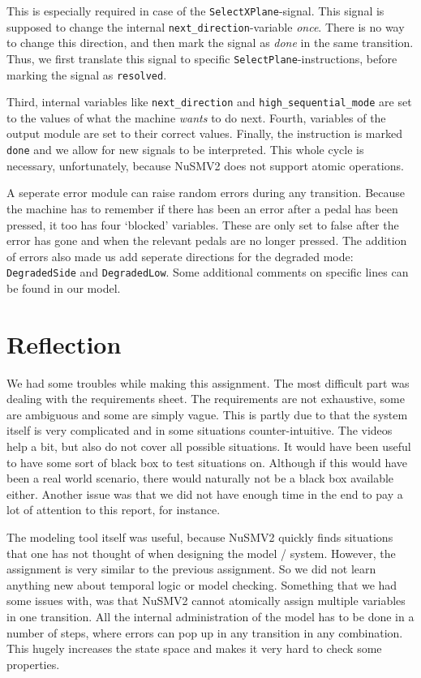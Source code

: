 \documentclass[a4paper,10pt]{article}
\begin{document}
	This is especially required in case of the \texttt{SelectXPlane}-signal.
	This signal is supposed to change the internal \texttt{next\_direction}-variable \emph{once}.
	There is no way to change this direction, and then mark the signal as \emph{done} in the same transition.
	Thus, we first translate this signal to specific \texttt{SelectPlane}-instructions, before marking the signal as \texttt{resolved}.

	Third, internal variables like \texttt{next\_direction} and \texttt{high\_sequential\_mode} are set to the values of what the machine \emph{wants} to do next.
	Fourth, variables of the output module are set to their correct values.
	Finally, the instruction is marked \texttt{done} and we allow for new signals to be interpreted.
	This whole cycle is necessary, unfortunately, because NuSMV2 does not support atomic operations.
	
	A seperate error module can raise random errors during any transition.
	Because the machine has to remember if there has been an error after a pedal has been pressed, it too has four `blocked' variables.
	These are only set to false after the error has gone and when the relevant pedals are no longer pressed.
	The addition of errors also made us add seperate directions for the degraded mode: \texttt{DegradedSide} and \texttt{DegradedLow}.
	Some additional comments on specific lines can be found in our model.

	\section{Reflection}
	We had some troubles while making this assignment.
	The most difficult part was dealing with the requirements sheet.
	The requirements are not exhaustive, some are ambiguous and some are simply vague.
	This is partly due to that the system itself is very complicated and in some situations counter-intuitive.
	The videos help a bit, but also do not cover all possible situations.
	It would have been useful to have some sort of black box to test situations on.
	Although if this would have been a real world scenario, there would naturally not be a black box available either.
	Another issue was that we did not have enough time in the end to pay a lot of attention to this report, for instance.
	
	The modeling tool itself was useful, because NuSMV2 quickly finds situations that one has not thought of when designing the model / system.
	However, the assignment is very similar to the previous assignment.
	So we did not learn anything new about temporal logic or model checking.
	Something that we had some issues with, was that NuSMV2 cannot atomically assign multiple variables in one transition.
	All the internal administration of the model has to be done in a number of steps, where errors can pop up in any transition in any combination.
	This hugely increases the state space and makes it very hard to check some properties.
	
\end{document}

